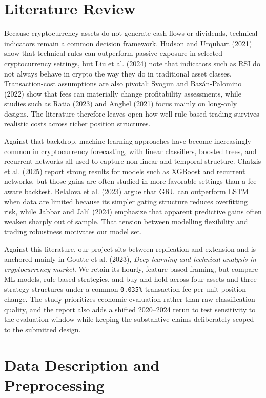 \documentclass[12pt]{article}
\begin{document}
\section{Literature Review}

Because cryptocurrency assets do not generate cash flows or dividends, technical indicators remain a common decision framework. Hudson and Urquhart (2021) show that technical rules can outperform passive exposure in selected cryptocurrency settings, but Liu et al. (2024) note that indicators such as RSI do not always behave in crypto the way they do in traditional asset classes. Transaction-cost assumptions are also pivotal: Svogun and Baz\'an-Palomino (2022) show that fees can materially change profitability assessments, while studies such as Ratia (2023) and Anghel (2021) focus mainly on long-only designs. The literature therefore leaves open how well rule-based trading survives realistic costs across richer position structures.

Against that backdrop, machine-learning approaches have become increasingly common in cryptocurrency forecasting, with linear classifiers, boosted trees, and recurrent networks all used to capture non-linear and temporal structure. Chatzis et al. (2025) report strong results for models such as XGBoost and recurrent networks, but those gains are often studied in more favorable settings than a fee-aware backtest. Belalova et al. (2023) argue that GRU can outperform LSTM when data are limited because its simpler gating structure reduces overfitting risk, while Jabbar and Jalil (2024) emphasize that apparent predictive gains often weaken sharply out of sample. That tension between modelling flexibility and trading robustness motivates our model set.

Against this literature, our project sits between replication and extension and is anchored mainly in Goutte et al. (2023), \textit{Deep learning and technical analysis in cryptocurrency market}. We retain its hourly, feature-based framing, but compare ML models, rule-based strategies, and buy-and-hold across four assets and three strategy structures under a common \texttt{0.035\%} transaction fee per unit position change. The study prioritizes economic evaluation rather than raw classification quality, and the report also adds a shifted 2020--2024 rerun to test sensitivity to the evaluation window while keeping the substantive claims deliberately scoped to the submitted design.

\section{Data Description and Preprocessing}
\end{document}
